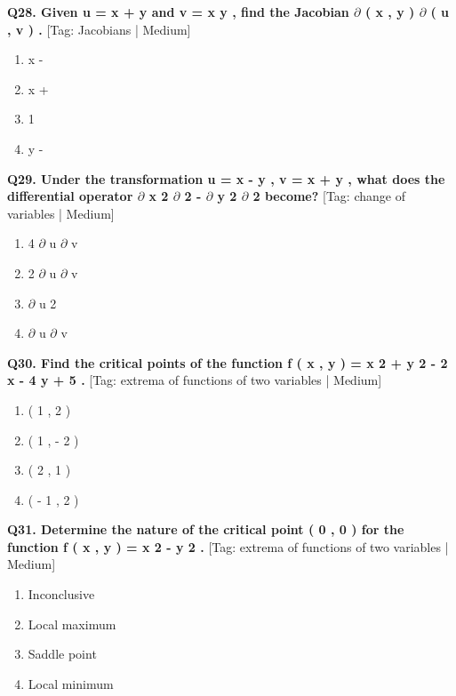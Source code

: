 \noindent\textbf{Q28. Given u = x + y and v = x y , find the Jacobian $\partial$ ( x , y ) $\partial$ ( u , v ) .} \hfill [Tag: Jacobians | Medium]
\begin{enumerate}[label=(\alph*),topsep=2pt,itemsep=1pt,partopsep=0pt,parsep=0pt]
    \item {{x -}}
    \item {{x +}}
    \item {{1}}
    \item {{y -}}
\end{enumerate}
\vspace{2mm}

\noindent\textbf{Q29. Under the transformation u = x - y , v = x + y , what does the differential operator $\partial$ x 2 $\partial$ 2 - $\partial$ y 2 $\partial$ 2 become?} \hfill [Tag: change of variables | Medium]
\begin{enumerate}[label=(\alph*),topsep=2pt,itemsep=1pt,partopsep=0pt,parsep=0pt]
    \item {{4 $\partial$ u $\partial$ v}}
    \item {{2 $\partial$ u $\partial$ v}}
    \item {{$\partial$ u 2}}
    \item {{$\partial$ u $\partial$ v}}
\end{enumerate}
\vspace{2mm}

\noindent\textbf{Q30. Find the critical points of the function f ( x , y ) = x 2 + y 2 - 2 x - 4 y + 5 .} \hfill [Tag: extrema of functions of two variables | Medium]
\begin{enumerate}[label=(\alph*),topsep=2pt,itemsep=1pt,partopsep=0pt,parsep=0pt]
    \item {{( 1 , 2 )}}
    \item {{( 1 , - 2 )}}
    \item {{( 2 , 1 )}}
    \item {{( - 1 , 2 )}}
\end{enumerate}
\vspace{2mm}

\noindent\textbf{Q31. Determine the nature of the critical point ( 0 , 0 ) for the function f ( x , y ) = x 2 - y 2 .} \hfill [Tag: extrema of functions of two variables | Medium]
\begin{enumerate}[label=(\alph*),topsep=2pt,itemsep=1pt,partopsep=0pt,parsep=0pt]
    \item {{Inconclusive}}
    \item {{Local maximum}}
    \item {{Saddle point}}
    \item {{Local minimum}}
\end{enumerate}
\vspace{2mm}


